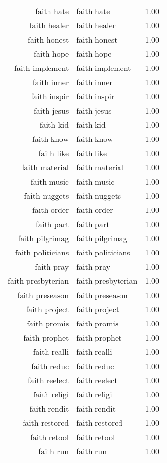 \begin{table}[ht]
\begin{tabular}{rlr}
  faith hate & faith hate & 1.00 \\ 
  faith healer & faith healer & 1.00 \\ 
  faith honest & faith honest & 1.00 \\ 
  faith hope & faith hope & 1.00 \\ 
  faith implement & faith implement & 1.00 \\ 
  faith inner & faith inner & 1.00 \\ 
  faith inspir & faith inspir & 1.00 \\ 
  faith jesus & faith jesus & 1.00 \\ 
  faith kid & faith kid & 1.00 \\ 
  faith know & faith know & 1.00 \\ 
  faith like & faith like & 1.00 \\ 
  faith material & faith material & 1.00 \\ 
  faith music & faith music & 1.00 \\ 
  faith nuggets & faith nuggets & 1.00 \\ 
  faith order & faith order & 1.00 \\ 
  faith part & faith part & 1.00 \\ 
  faith pilgrimag & faith pilgrimag & 1.00 \\ 
  faith politicians & faith politicians & 1.00 \\ 
  faith pray & faith pray & 1.00 \\ 
  faith presbyterian & faith presbyterian & 1.00 \\ 
  faith preseason & faith preseason & 1.00 \\ 
  faith project & faith project & 1.00 \\ 
  faith promis & faith promis & 1.00 \\ 
  faith prophet & faith prophet & 1.00 \\ 
  faith realli & faith realli & 1.00 \\ 
  faith reduc & faith reduc & 1.00 \\ 
  faith reelect & faith reelect & 1.00 \\ 
  faith religi & faith religi & 1.00 \\ 
  faith rendit & faith rendit & 1.00 \\ 
  faith restored & faith restored & 1.00 \\ 
  faith retool & faith retool & 1.00 \\ 
  faith run & faith run & 1.00 \\ 

\end{tabular}
\end{table}
